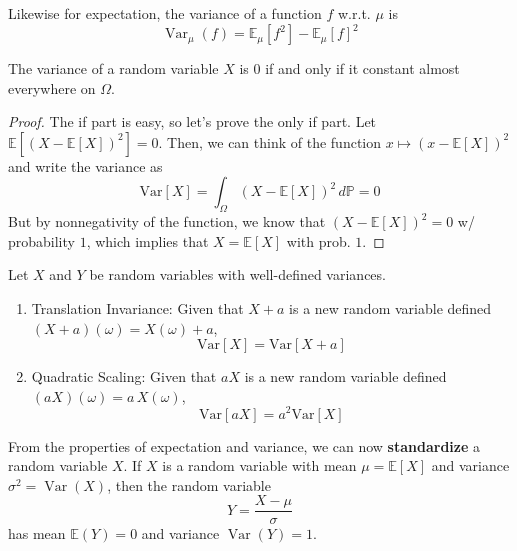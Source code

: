 \documentclass{article}
\DeclareMathOperator{\Var}{Var}
\begin{document}
    Likewise for expectation, the variance of a function $f$ w.r.t. $\mu$ is 
    \begin{equation}
      \Var_\mu (f) = \mathbb{E}_\mu [f^2] - \mathbb{E}_\mu [f]^2
    \end{equation}

    \begin{proposition}
      The variance of a random variable $X$ is $0$ if and only if it constant almost everywhere on $\Omega$. 
    \end{proposition}
    \begin{proof}
      The if part is easy, so let's prove the only if part. Let $\mathbb{E} [ (X - \mathbb{E}[X])^2 ] = 0$. Then, we can think of the function $x \mapsto (x - \mathbb{E}[X])^2$ and write the variance as 
      \begin{equation}
        \mathrm{Var}[X] = \int_\Omega (X - \mathbb{E}[X])^2 \, d\mathbb{P} = 0
      \end{equation}
      But by nonnegativity of the function, we know that $(X - \mathbb{E}[X])^2 = 0$ w/ probability $1$, which implies that $X = \mathbb{E}[X]$ with prob. $1$. 
    \end{proof}

    \begin{lemma}
      Let $X$ and $Y$ be random variables with well-defined variances. 
      \begin{enumerate}
        \item Translation Invariance: Given that $X + a$ is a new random variable defined $(X + a)(\omega) = X(\omega) + a$, 
        \begin{equation}
          \mathrm{Var}[X] = \mathrm{Var}[X + a]
        \end{equation}
        \item Quadratic Scaling: Given that $aX$ is a new random variable defined $(aX)(\omega) = a\,X(\omega)$, 
        \begin{equation}
          \mathrm{Var}[aX] = a^2 \mathrm{Var}[X]
        \end{equation}
      \end{enumerate}
    \end{lemma}

    From the properties of expectation and variance, we can now \textbf{standardize} a random variable $X$. If $X$ is a random variable with mean $\mu = \mathbb{E}[X]$ and variance $\sigma^2 = \Var(X)$, then the random variable 
    \begin{equation}
      Y = \frac{X - \mu}{\sigma}
    \end{equation}
    has mean $\mathbb{E}(Y) = 0$ and variance $\Var(Y) = 1$. 
\end{document}
